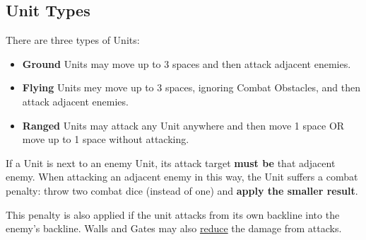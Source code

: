 \begin{multicols}{2}
\subsection*{\hypertarget{Unittype}{Unit Types}}
There are three types of Units:
\begin{itemize}
  \item \textbf{Ground}  Units may move up to 3 spaces and then attack adjacent enemies.
  \item \textbf{Flying}  Units mey move up to 3 spaces, ignoring Combat Obstacles, and then attack adjacent enemies.
  \item \textbf{Ranged}  Units may attack any Unit anywhere and then move 1 space OR move up to 1 space without attacking.
\end{itemize}
If a  Unit is next to an enemy Unit, its attack target \textbf{must be} that adjacent enemy.
When attacking an adjacent enemy in this way, the  Unit suffers a combat penalty: throw two combat dice (instead of one) and \textbf{apply the smaller result}.\par
This penalty is also applied if the  unit attacks from its own backline into the enemy's backline.
Walls and Gates may also \hyperlink{Walls}{reduce} the damage from   attacks.


\end{multicols}
